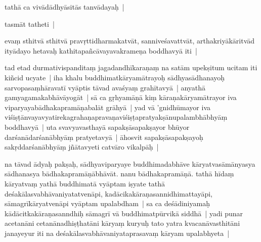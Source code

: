 \documentclass[article,a4paper]{memoir}
\begin{document}
	  \pstart tathā\- ca vivā\-dā\-dhyā\-sitā\-s tanvā\-dayaḥ |
	\pend
      

	  \pstart tasmā\-t tatheti |
	\pend
      

	  \pstart evaṃ sthitvā\- sthitvā\- pravṛttidharmakatvā\-t, sanniveśavattvā\-t, arthakriyā\-kā\-ritvā\-d ityā\-dayo hetavaḥ kathitapañcā\-vayavakrameṇa boddhavyā\- iti |
	\pend
      \label{īsd-uttarapakṣa}
	  
	\label{īsd-vyāptigrahaṇa}
	  
	

	  \pstart tad etad durmativispanditaṃ jagadandhī\-karaṇaṃ na satā\-m upekṣitum ucitam iti kiñcid ucyate | iha khalu buddhimatkā\-ryamā\-trayoḥ sā\-dhyasā\-dhanayoḥ sarvopasaṃhā\-ravatī\- vyā\-ptis tā\-vad avaśyaṃ grahī\-tavyā\- | anyathā\- gamyagamakabhā\-vā\-yogā\-t | sā\- ca gṛhyamā\-ṇā\- kiṃ kā\-raṇakā\-ryamā\-trayor iva viparyayabā\-dhakapramā\-ṇabalā\-t grā\-hyā\- | yad vā\- 'gnidhū\-mayor iva viśiṣṭā\-nvayavyatirekagrahaṇapravaṇaviśiṣṭapratyakṣā\-nupalambhā\-bhyā\-ṃ boddhavyā\- | uta svavyavasthayā\- sapakṣā\-sapakṣayor bhū\-yor darśanā\-darśanā\-bhyā\-ṃ pratyetavyā\- | ā\-hosvit sapakṣā\-sapakṣayoḥ sakṛddarśanā\-bhyā\-ṃ jñā\-tavyeti catvā\-ro vikalpā\-ḥ |
	\pend
      
	  
	

	  \pstart na tā\-vad ā\-dyaḥ pakṣaḥ, sā\-dhyaviparyaye buddhimadabhā\-ve kā\-ryatvasā\-mā\-nyasya sā\-dhanasya bā\-dhakapramā\-ṇā\-bhā\-vā\-t. nanu bā\-dhakapramā\-ṇā\-. tathā\- hī\-daṃ kā\-ryatvaṃ yathā\- buddhimatā\- vyā\-ptam iṣyate tathā\- deśakā\-lasvabhā\-vaniyatatvenā\-pi, kadā\-cikakā\-raṇasannidhimattayā\-pi, sā\-magrī\-kā\-ryatvenā\-pi vyā\-ptam upalabdham | sa ca deśā\-diniyamaḥ kā\-dā\-citkakā\-raṇasanndhiḥ sā\-magrī\- vā\- buddhimatpū\-rvikā\- siddhā\- | yadi punar acetanā\-ni cetanā\-nadhiṣṭhatā\-ni kā\-ryaṃ kuryuḥ tato yatra kvacanā\-vasthitā\-ni janayeyur iti na deśakā\-lasvabhā\-vaniyataprasavaṃ kā\-ryam upalabhyeta |
	\pend
      
\end{document}
